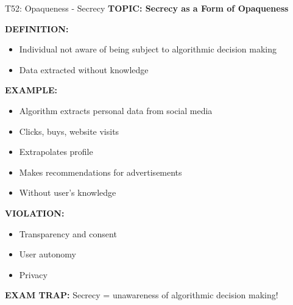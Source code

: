 \documentclass[8pt]{beamer}
\begin{document}
	\begin{frame}{T52: Opaqueness - Secrecy}
		\fontsize{6.5}{7.5}\selectfont
		\textbf{TOPIC: Secrecy as a Form of Opaqueness}
		
		\vspace{0.1cm}
		\textbf{DEFINITION:}
		\begin{itemize}
			\item Individual not aware of being subject to algorithmic decision making
			\item Data extracted without knowledge
		\end{itemize}
		
		\vspace{0.1cm}
		\textbf{EXAMPLE:}
		\begin{itemize}
			\item Algorithm extracts personal data from social media
			\item Clicks, buys, website visits
			\item Extrapolates profile
			\item Makes recommendations for advertisements
			\item Without user's knowledge
		\end{itemize}
		
		\vspace{0.1cm}
		\textbf{VIOLATION:}
		\begin{itemize}
			\item Transparency and consent
			\item User autonomy
			\item Privacy
		\end{itemize}
		
		\textcolor{myred}{\textbf{EXAM TRAP:}} Secrecy = \textcolor{myblue}{unawareness of algorithmic decision making}!
	\end{frame}
	
\end{document}
